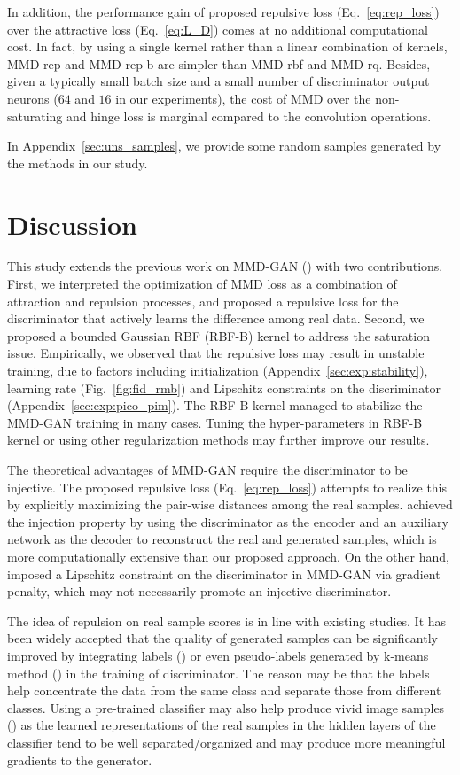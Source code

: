 \documentclass{article} %
\theoremstyle{plain}
\newtheorem*{proposition 1*}{Proposition 1}
\begin{document}
In addition, the performance gain of proposed repulsive loss (Eq.~\ref{eq:rep_loss}) over the attractive loss (Eq.~\ref{eq:L_D}) comes at no additional computational cost. In fact, by using a single kernel rather than a linear combination of kernels, MMD-rep and MMD-rep-b are simpler than MMD-rbf and MMD-rq. Besides, given a typically small batch size and a small number of discriminator output neurons (\(64\) and \(16\) in our experiments), the cost of MMD over the non-saturating and hinge loss is marginal compared to the convolution operations. 

In Appendix~\ref{sec:uns_samples}, we provide some random samples generated by the methods in our study.

\section{Discussion}
\label{sec:discussion}

This study extends the previous work on MMD-GAN (\cite{mmd_gan_g}) with two contributions. First, we interpreted the optimization of MMD loss as a combination of attraction and repulsion processes, and proposed a repulsive loss for the discriminator that actively learns the difference among real data. Second, we proposed a bounded Gaussian RBF (RBF-B) kernel to address the saturation issue. Empirically, we observed that the repulsive loss may result in unstable training, due to factors including initialization (Appendix~\ref{sec:exp:stability}), learning rate (Fig.~\ref{fig:fid_rmb}) and Lipschitz constraints on the discriminator (Appendix~\ref{sec:exp:pico_pim}). The RBF-B kernel managed to stabilize the MMD-GAN training in many cases. Tuning the hyper-parameters in RBF-B kernel or using other regularization methods may further improve our results. 

The theoretical advantages of MMD-GAN require the discriminator to be injective. The proposed repulsive loss (Eq.~\ref{eq:rep_loss}) attempts to realize this by explicitly maximizing the pair-wise distances among the real samples. \cite{mmd_gan_g} achieved the injection property by using the discriminator as the encoder and an auxiliary network as the decoder to reconstruct the real and generated samples, which is more computationally extensive than our proposed approach. On the other hand, \cite{mmd_gan_t,mmd_gp} imposed a Lipschitz constraint on the discriminator in MMD-GAN via gradient penalty, which may not necessarily promote an injective discriminator. 

The idea of repulsion on real sample scores is in line with existing studies. It has been widely accepted that the quality of generated samples can be significantly improved by integrating labels (\cite{acgan,cgan,class_aware}) or even pseudo-labels generated by k-means method (\cite{split}) in the training of discriminator. The reason may be that the labels help concentrate the data from the same class and separate those from different classes. Using a pre-trained classifier may also help produce vivid image samples (\cite{stack}) as the learned representations of the real samples in the hidden layers of the classifier tend to be well separated/organized and may produce more meaningful gradients to the generator.
\end{document}
